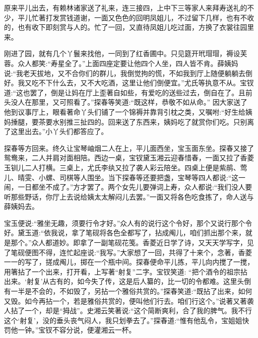 \begin{parag}
    原来平儿出去，有赖林诸家送了礼来，连三接四，上中下三等家人来拜寿送礼的不少，平儿忙著打发赏钱道谢，一面又色色的回明凤姐儿，不过留下几样，也有不收的，也有收下即刻赏与人的。忙了一回，又直待凤姐儿吃过面，方换了衣裳往园里来。
\end{parag}


\begin{parag}
    刚进了园，就有几个丫鬟来找他，一同到了红香圃中。只见筵开玳瑁瑁，褥设芙蓉。众人都笑:“寿星全了。”上面四座定要让他四个人坐，四人皆不肯。薛姨妈说:“我老天拔地，又不合你们的群儿，我倒觉拘的慌，不如我到厅上随便躺躺去倒好。我又吃不下什么去，又不大吃酒，这里让他们倒便宜。”尤氏等执意不从。宝钗道:“这也罢了，倒是让妈在厅上歪著自如些，有爱吃的送些过去，倒自在了。且前头没人在那里，又可照看了。”探春等笑道:“既这样，恭敬不如从命。” 因大家送了他到议事厅上，眼看著命丫头们铺了一个锦褥并靠背引枕之类，又嘱咐:“好生给姨妈捶腿，要茶要水别推三扯四的。回来送了东西来，姨妈吃了就赏你们吃。只别离了这里出去。”小丫头们都答应了。
\end{parag}


\begin{parag}
    探春等方回来。终久让宝琴岫烟二人在上，平儿面西坐，宝玉面东坐。探春又接了鸳鸯来，二人并肩对面相陪。西边一桌，宝钗黛玉湘云迎春惜春，一面又拉了香菱玉钏儿二人打横。三桌上，尤氏李纨又拉了袭人彩云陪坐。四桌上便是紫鹃、莺儿、晴雯、小螺、司棋等人围坐。当下探春等还要把盏，宝琴等四人都说:“这一闹，一日都坐不成了。”方才罢了。两个女先儿要弹词上寿，众人都说:“我们没人要听那些野话，你厅上去说给姨太太解闷儿去罢。”一面又将各色吃食拣了，命人送与薛姨妈去。
\end{parag}


\begin{parag}
    宝玉便说:“雅坐无趣，须要行令才好。”众人有的说行这个令好，那个又说行那个令好。黛玉道:“依我说，拿了笔砚将各色全都写了，拈成阄儿，咱们抓出那个来，就是那个。”众人都道妙。即拿了一副笔砚花笺。香菱近日学了诗，又天天学写字，见了笔砚便图不得，连忙起座说:“我写。”大家想了一回，共得了十来个，念著，香菱一一的写了，搓成阄儿，掷在一个瓶中间。探春便命平儿拣，平儿向内搅了一搅，用箸拈了一个出来，打开看，上写著“射复”二字。宝钗笑道: “把个酒令的祖宗拈出来。‘射复’从古有的，如今失了传，这是后人纂的，比一切的令都难。这里头倒有一半是不会的，不如毁了，另拈一个雅俗共赏的。”探春笑道:“既拈了出来，如何又毁。如今再拈一个，若是雅俗共赏的，便叫他们行去。咱们行这个。”说著又著袭人拈了一个，却是“拇战”。史湘云笑著说:“这个简断爽利，合了我的脾气。我不行这个‘射复’，没的垂头丧气闷人，我只划拳去了。”探春道:“惟有他乱令，宝姐姐快罚他一钟。”宝钗不容分说，便灌湘云一杯。
\end{parag}


